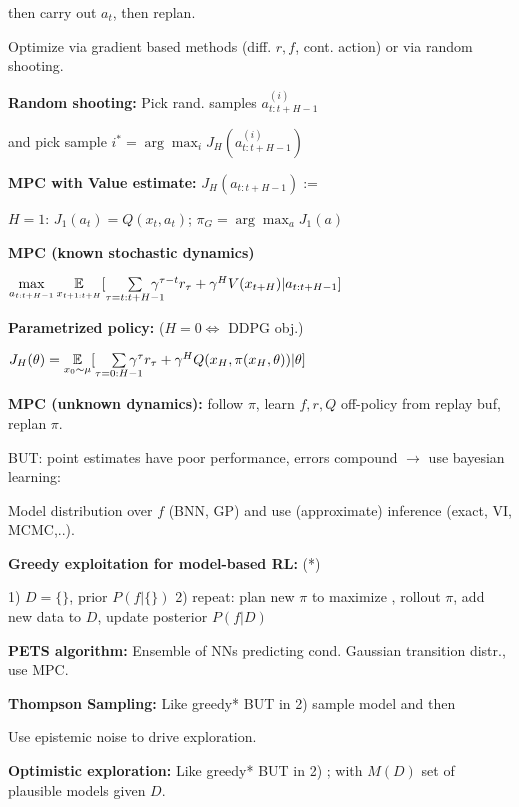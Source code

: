 then carry out $a_t$, then replan.

Optimize via gradient based methods (diff. $r, f$, cont. action) or via random shooting.

\vspace*{-2mm}
\textbf{Random shooting:} Pick rand. samples $a_{t:t+H-1}^{(i)}$

\vspace*{-1mm}
and pick sample $i^* = \arg\max_i J_H(a_{t:t+H-1}^{(i)})$

\textbf{MPC with Value estimate:} $J_H(a_{t:t+H-1}) :=$

$H=1$: $J_1(a_t) = Q(x_t, a_t)$; $\pi_G = \arg\max_a J_1(a)$

\textbf{MPC (known stochastic dynamics)}

{\fontsize{10}{6}\selectfont $\max\limits_{a_{t:t+H-1}} \underset{x_{t+1:t+H}}{\mathbb{E}} [ \sum\limits_{\tau = t:t+H-1} \hspace*{-4mm} \gamma^{\tau - t} r_\tau + \gamma^H V(x_{t+H}) | a_{t:t+H-1} ]$}


\textbf{Parametrized policy:} ($H = 0 \Leftrightarrow$ DDPG obj.)

$J_H(\theta) = \underset{x_0 \sim \mu}{\mathbb{E}} [ \sum\limits_{\tau = 0:H-1} \hspace*{-4mm} \gamma^{\tau} r_\tau + \gamma^H Q(x_{H}, \pi(x_H, \theta)) | \theta ]$

\textbf{MPC (unknown dynamics):} follow $\pi$, learn $f, r, Q$ off-policy from replay buf, replan $\pi$.

BUT: point estimates have poor performance, errors compound $\rightarrow$ use bayesian learning:

Model distribution over $f$ (BNN, GP) and use (approximate) inference (exact, VI, MCMC,..).

\textbf{Greedy exploitation for model-based RL:} \textcolor{mypink}{(*)}

1) $D=\{\}$, prior $P(f|\{\})$ 2) repeat: plan new $\pi$ to maximize , rollout $\pi$, add new data to $D$, update posterior $P(f | D)$

\textbf{PETS algorithm:} Ensemble of NNs predicting cond. Gaussian transition distr., use MPC.

\textbf{Thompson Sampling:} Like greedy\textcolor{mypink}{*} BUT in 2) sample model  and then 

Use epistemic noise to drive exploration.

\textbf{Optimistic exploration:} Like greedy\textcolor{mypink}{*} BUT in 2) ; with $M(D)$ set of plausible models given $D$.
